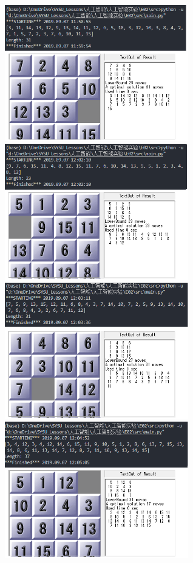 \documentclass[a4paper, 11pt]{article}
\begin{document}
	\begin{figure}[ht]
	\centering
	\includegraphics[width=8cm]{assets/mytest1}
	\quad
	\includegraphics[width=8cm]{assets/mytest2}
	\\
	\includegraphics[width=8cm]{assets/mytest3}
	\quad
	\includegraphics[width=8cm]{assets/mytest4}
	
	\end{figure}
\end{document}
